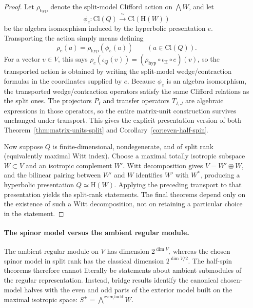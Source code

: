 \documentclass{birkjour}
\theoremstyle{plain}
\theoremstyle{definition}
\theoremstyle{remark}
\numberwithin{equation}{section}
\newcommand{\Cl}{\mathrm{Cl}}
\newcommand{\Hyp}{\mathrm{H}}
\begin{document}
\begin{proof}
Let $\rho_{\mathrm{hyp}}$ denote the split-model Clifford action on
$\bigwedge W$, and let
\[
  \phi_e:\Cl(Q)\xrightarrow{\ \simeq\ }\Cl(\Hyp(W))
\]
be the algebra isomorphism induced by the hyperbolic presentation $e$.
Transporting the action simply means defining
\[
  \rho_e(a)=\rho_{\mathrm{hyp}}(\phi_e(a))
  \qquad (a\in \Cl(Q)).
\]
For a vector $v\in V$, this says
\(\rho_e(\iota_Q(v)) = (\rho_{\mathrm{hyp}}\circ \iota_{\Hyp}\circ e)(v)\),
so the transported action is obtained by writing the split-model
wedge/contraction formulas in the coordinates supplied by $e$.
Because $\phi_e$ is an algebra isomorphism, the transported wedge/contraction
operators satisfy the same Clifford relations as the split ones. The
projectors $P_I$ and transfer operators $T_{I,J}$ are algebraic expressions in
those operators, so the entire matrix-unit construction survives unchanged
under transport. This gives the explicit-presentation version of both
Theorem~\ref{thm:matrix-units-split} and
Corollary~\ref{cor:even-half-spin}.

Now suppose $Q$ is finite-dimensional, nondegenerate, and of split rank
(equivalently maximal Witt index). Choose a maximal totally isotropic subspace $W\subset V$ and an
isotropic complement $W'$. Witt decomposition gives
$V=W'\oplus W$, and the bilinear pairing between $W'$ and $W$ identifies
$W'$ with $W^*$, producing a hyperbolic presentation
$Q\simeq \Hyp(W)$. Applying the preceding transport to that presentation
yields the split-rank statements. The final theorems depend only on the
existence of such a Witt decomposition, not on retaining a particular choice in
the statement.
\end{proof}

\paragraph{The spinor model versus the ambient regular module.}
The ambient regular module on $V$ has dimension
$2^{\dim V}$, whereas the chosen spinor model in split rank has the classical
dimension $2^{\dim V/2}$. The half-spin theorems therefore cannot literally be
statements about ambient submodules of the regular representation. Instead,
bridge results identify the canonical chosen-model halves with the even and odd
parts of the exterior model built on the maximal isotropic space:
$S^{\pm} = \bigwedge^{\mathrm{even}/\mathrm{odd}} W$.
\end{document}
